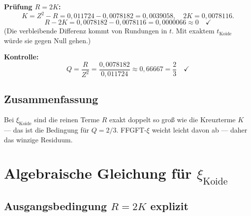 \textbf{Prüfung $R=2K$:}
\[
  K=Z^2-R=0{,}011724-0{,}0078182=0{,}0039058, \quad
  2K=0{,}0078116.
\]
\[
  R-2K = 0{,}0078182-0{,}0078116=0{,}0000066
  \approx0\quad\checkmark
\]
(Die verbleibende Differenz kommt von Rundungen in $t$.
Mit exaktem $t_{\text{Koide}}$ würde sie gegen Null gehen.)

\textbf{Kontrolle:}
\[
  Q=\frac{R}{Z^2}=\frac{0{,}0078182}{0{,}011724}\approx0{,}66667=\frac{2}{3}\quad\checkmark
\]

\subsection{Zusammenfassung}

\begin{center}
\renewcommand{\arraystretch}{1.4}
\end{center}

Bei $\xi_{\text{Koide}}$ sind die reinen Terme $R$ exakt doppelt so groß
wie die Kreuzterme $K$ — das ist die Bedingung für $Q=2/3$.
FFGFT-$\xi$ weicht leicht davon ab — daher das winzige Residuum.

\section{Algebraische Gleichung für $\xi_{\text{Koide}}$}


\subsection{Ausgangsbedingung $R=2K$ explizit}

